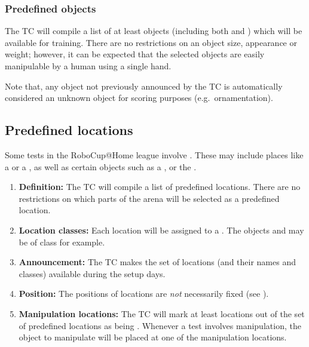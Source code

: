 \subsubsection{Predefined objects}
The TC will compile a list of at least \NumObjects objects (including both  and ) which will be available for training. There are no restrictions on an object size, appearance or weight; however, it can be expected that the selected objects are easily manipulable by a human using a single hand.

Note that, any object not previously announced by the TC is automatically considered an unknown object for scoring purposes (e.g.~ornamentation).

%
%

\subsection{Predefined locations}
\label{rule:scenario_locations}

Some tests in the RoboCup@Home league involve . 
These may include places like a  or a , as well as certain objects such as a , or the . 

\begin{enumerate}
	\item \textbf{Definition:} The TC will compile a list of predefined locations. There are no restrictions on which parts of the arena will be selected as a predefined location.

	\item \textbf{Location classes:} Each location will be assigned to a . The objects  and  may be of class  for example. 

	\item \textbf{Announcement:} The TC makes the set of locations (and their names and classes) available during the setup days.

	\item \textbf{Position:} The positions of locations are \emph{not} necessarily fixed (see ).

	\item \textbf{Manipulation locations:} The TC will mark at least \NumLocations locations out of the set of predefined locations as being . Whenever a test involves manipulation, the object to manipulate will be placed at one of the manipulation locations. 
\end{enumerate}



